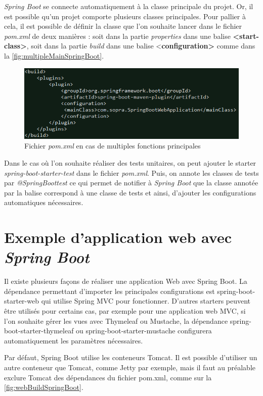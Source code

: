 \documentclass{polytech/polytech}
\begin{document}
\textit{Spring Boot} se connecte automatiquement à la classe principale du projet. Or, il est possible qu’un projet comporte plusieurs classes principales. Pour pallier à cela, il est possible de définir la classe que l’on souhaite lancer dans le fichier \textit{pom.xml} de deux manières : soit dans la partie \textit{properties} dans une balise \textbf{<start-class>}, soit dans la partie \textit{build} dans une balise <\textbf{configuration>} comme dans la  \autoref{fig:multipleMainSpringBoot}.

\begin{figure}
	\includegraphics[scale=0.8]{images/multipleMain}
	\caption{Fichier \textit{pom.xml} en cas de multiples fonctions principales}
	\label{fig:multipleMainSpringBoot}
\end{figure}

Dans le cas où l'on souhaite réaliser des tests unitaires, on peut ajouter le starter \textit{spring-boot-starter-test} dans le fichier \textit{pom.xml}. Puis, on annote les classes de tests par \textit{@SpringBoottest} ce qui permet de notifier à \textit{Spring Boot} que la classe annotée par la balise correspond à une classe de tests et ainsi, d'ajouter les configurations automatiques nécessaires.

\section{Exemple d'application web avec \textit{Spring Boot}}

Il existe plusieurs façons de réaliser une application Web avec Spring Boot. La dépendance permettant d’importer les principales configurations est spring-boot-starter-web qui utilise Spring MVC pour fonctionner. D’autres starters peuvent être utilisés pour certains cas, par exemple pour une application web MVC, si l’on souhaite gérer les vues avec Thymeleaf ou Mustache, la dépendance spring-boot-starter-thymeleaf ou spring-boot-starter-mustache configurera automatiquement les paramètres nécessaires. 

Par défaut, Spring Boot utilise les conteneurs Tomcat. Il est possible d’utiliser un autre conteneur que Tomcat, comme Jetty par exemple, mais il faut au préalable exclure Tomcat des dépendances du fichier pom.xml, comme sur la \autoref{fig:webBuildSpringBoot}.
\end{document}
